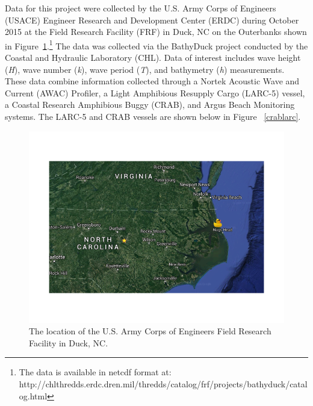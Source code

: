 Data for this project were collected by the U.S. Army Corps of Engineers (USACE) Engineer Research and Development Center (ERDC) during October 2015 at the Field Research Facility (FRF) in Duck, NC on the Outerbanks shown in Figure~\ref{FRFmap}.\footnote{The data is available in netcdf format at: \\ http://chlthredds.erdc.dren.mil/thredds/catalog/frf/projects/bathyduck/catalog.html} The data was collected via the BathyDuck project conducted by the Coastal and Hydraulic Laboratory (CHL). Data of interest includes wave height (\textit{H}), wave number (\textit{k}), wave period (\textit{T}), and bathymetry (\textit{h}) measurements. These data combine information collected through a Nortek Acoustic Wave and Current (AWAC) Profiler, a Light Amphibious Resupply Cargo (LARC-5) vessel, a Coastal Research Amphibious Buggy (CRAB), and Argus Beach Monitoring systems. The LARC-5 and CRAB vessels are shown below in Figure ~\ref{crablarc}.

\begin{figure}[H]
\centering
\includegraphics[width=0.8\linewidth]{img/FRF_map.png}
\caption{The location of the U.S. Army Corps of Engineers Field Research Facility in Duck, NC.}
\label{FRFmap}
\end{figure}

